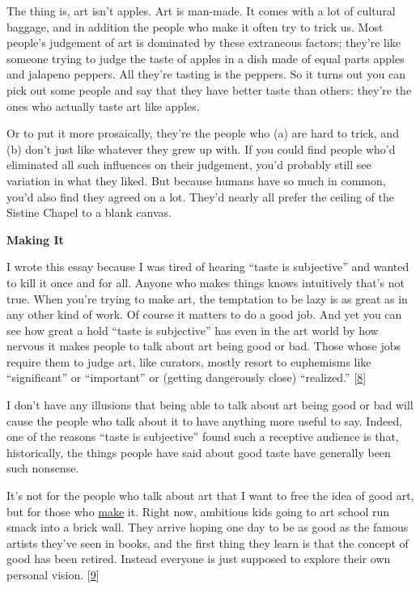The thing is, art isn't apples. Art is man-made. It comes with a lot of
cultural baggage, and in addition the people who make it often try to
trick us. Most people's judgement of art is dominated by these
extraneous factors; they're like someone trying to judge the taste of
apples in a dish made of equal parts apples and jalapeno peppers. All
they're tasting is the peppers. So it turns out you can pick out some
people and say that they have better taste than others: they're the ones
who actually taste art like apples.

Or to put it more prosaically, they're the people who (a) are hard to
trick, and (b) don't just like whatever they grew up with. If you could
find people who'd eliminated all such influences on their judgement,
you'd probably still see variation in what they liked. But because
humans have so much in common, you'd also find they agreed on a lot.
They'd nearly all prefer the ceiling of the Sistine Chapel to a blank
canvas.

\textbf{Making It}

I wrote this essay because I was tired of hearing ``taste is
subjective'' and wanted to kill it once and for all. Anyone who makes
things knows intuitively that's not true. When you're trying to make
art, the temptation to be lazy is as great as in any other kind of work.
Of course it matters to do a good job. And yet you can see how great a
hold ``taste is subjective'' has even in the art world by how nervous it
makes people to talk about art being good or bad. Those whose jobs
require them to judge art, like curators, mostly resort to euphemisms
like ``significant'' or ``important'' or (getting dangerously close)
``realized.'' {[}\hyperref[f8n]{8}{]}

I don't have any illusions that being able to talk about art being good
or bad will cause the people who talk about it to have anything more
useful to say. Indeed, one of the reasons ``taste is subjective'' found
such a receptive audience is that, historically, the things people have
said about good taste have generally been such nonsense.

It's not for the people who talk about art that I want to free the idea
of good art, but for those who \href{taste.html}{make} it. Right now,
ambitious kids going to art school run smack into a brick wall. They
arrive hoping one day to be as good as the famous artists they've seen
in books, and the first thing they learn is that the concept of good has
been retired. Instead everyone is just supposed to explore their own
personal vision. {[}\hyperref[f9n]{9}{]}

